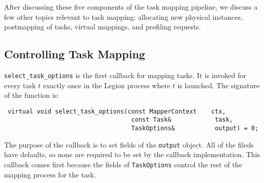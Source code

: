 After discussing these five components of the task mapping pipeline, we discuss a few other topics relevant to task mapping: allocating new physical instances, postmapping of tasks, virtual mappings, and profiling requests.

\subsection{Controlling Task Mapping}
{\tt select\_task\_options} is the first callback for mapping tasks. It is invoked for every task $t$ exactly once in the Legion process where $t$ is launched.
The signature of the function is:
\begin{lstlisting}
 virtual void select_task_options(const MapperContext    ctx,
                                   const Task&            task,
                                   TaskOptions&           output) = 0;
\end{lstlisting}
The purpose of the callback is to set fields of the {\tt output} object.  All of the fileds have defaults, so none are required to be set by the callback implementation.
This callback comes first because the fields of {\tt TaskOptions} control the rest of the mapping process for the task.
